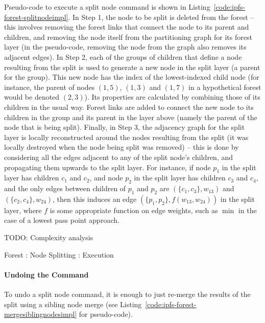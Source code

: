 Pseudo-code to execute a split node command is shown in Listing~\ref{code:ipfs-forest-splitnodeimpl}. In Step 1, the node to be split is deleted from the forest -- this involves removing the forest links that connect the node to its parent and children, and removing the node itself from the partitioning graph for its forest layer (in the pseudo-code, removing the node from the graph also removes its adjacent edges). In Step 2, each of the groups of children that define a node resulting from the split is used to generate a new node in the split layer (a parent for the group). This new node has the index of the lowest-indexed child node (for instance, the parent of nodes $(1,5)$, $(1,3)$ and $(1,7)$ in a hypothetical forest would be denoted $(2,3)$). Its properties are calculated by combining those of its children in the usual way. Forest links are added to connect the new node to its children in the group and its parent in the layer above (namely the parent of the node that is being split). Finally, in Step 3, the adjacency graph for the split layer is locally reconstructed around the nodes resulting from the split (it was locally destroyed when the node being split was removed) -- this is done by considering all the edges adjacent to any of the split node's children, and propagating them upwards to the split layer. For instance, if node $p_1$ in the split layer has children $c_1$ and $c_2$, and node $p_2$ in the split layer has children $c_3$ and $c_4$, and the only edges between children of $p_1$ and $p_2$ are $(\{c_1,c_3\}, w_{13})$ and $(\{c_2,c_4\}, w_{24})$, then this induces an edge $(\{p_1,p_2\}, f(w_{13}, w_{24}))$ in the split layer, where $f$ is some appropriate function on edge weights, such as $\min$ in the case of a lowest pass point approach.

TODO: Complexity analysis

\begin{stulisting}[p]
\caption{Forest : Node Splitting : Execution}
\label{code:ipfs-forest-splitnodeimpl}

\end{stulisting}

\paragraph{Undoing the Command}

To undo a split node command, it is enough to just re-merge the results of the split using a sibling node merge (see Listing~\ref{code:ipfs-forest-mergesiblingnodesimpl} for pseudo-code).

